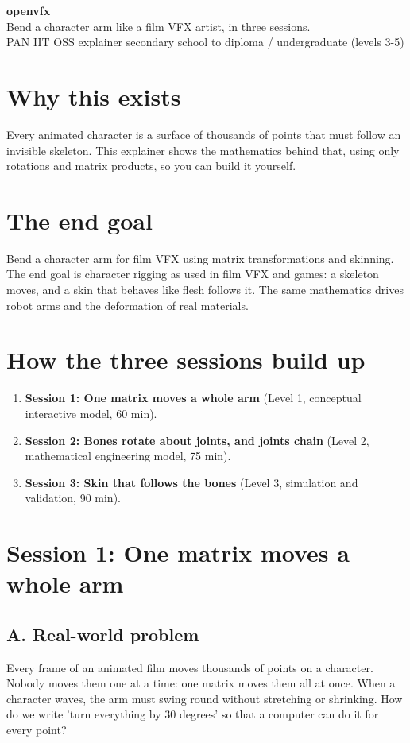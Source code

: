 \documentclass[11pt,a4paper]{article}
\begin{document}
\begin{center}{\LARGE\bfseries openvfx}\\[0.4em]{\large Bend a character arm like a film VFX artist, in three sessions.}\\[0.2em]\small PAN IIT OSS explainer \textbullet{} secondary school to diploma / undergraduate (levels 3-5)\end{center}

\section*{Why this exists}
Every animated character is a surface of thousands of points that must follow an invisible skeleton. This explainer shows the mathematics behind that, using only rotations and matrix products, so you can build it yourself.

\section*{The end goal}
Bend a character arm for film VFX using matrix transformations and skinning. The end goal is character rigging as used in film VFX and games: a skeleton moves, and a skin that behaves like flesh follows it. The same mathematics drives robot arms and the deformation of real materials.

\section*{How the three sessions build up}
\begin{enumerate}[nosep]
\item \textbf{Session 1: One matrix moves a whole arm} (Level 1, conceptual interactive model, 60 min).
\item \textbf{Session 2: Bones rotate about joints, and joints chain} (Level 2, mathematical engineering model, 75 min).
\item \textbf{Session 3: Skin that follows the bones} (Level 3, simulation and validation, 90 min).
\end{enumerate}

\section{Session 1: One matrix moves a whole arm}

\subsection*{A. Real-world problem}
Every frame of an animated film moves thousands of points on a character. Nobody moves them one at a time: one matrix moves them all at once. When a character waves, the arm must swing round without stretching or shrinking. How do we write 'turn everything by 30 degrees' so that a computer can do it for every point?
\end{document}
